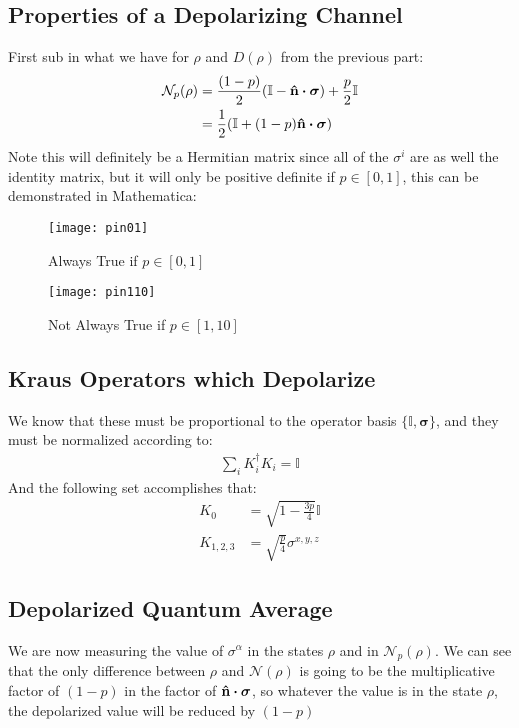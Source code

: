 \documentclass[12pt]{article}
\begin{document}
\subsection{Properties of a Depolarizing Channel}
First sub in what we have for $\rho$ and $D(\rho)$ from the previous part:
\begin{align*}
  \mathcal{N}_p(\rho)&=\frac{(1-p)}{2}(\mathbb{I}-\vu{n}\vdot\bm\sigma)
  +\frac{p}{2}\mathbb{I}\\
  &=\frac12\qty(\mathbb{I}+(1-p)\vu{n}\vdot\bm\sigma)
\end{align*}
Note this will definitely be a Hermitian matrix since all of the $\sigma^i$ are as well the identity matrix, but it will only be positive definite if $p\in[0,1]$, this can be demonstrated in Mathematica:
\begin{figure}[H]
  \centering
  \texttt{[image: pin01]}
  \caption{Always True if $p\in[0,1]$}
\end{figure}
\begin{figure}[H]
  \centering
  \texttt{[image: pin110]}
  \caption{Not Always True if $p\in[1,10]$}
\end{figure}
\subsection{Kraus Operators which Depolarize}
We know that these must be proportional to the operator basis $\{\mathbb{I},\bm\sigma\}$, and they must be normalized according to:
\begin{align*}
  \sum_iK_i^\dag K_i=\mathbb{I}
\end{align*}
And the following set accomplishes that:
\begin{equation*}
  \boxed{\begin{aligned}
      K_0&=\sqrt{1-\frac{3p}4}\mathbb{I}\\
      K_{1,2,3}&=\sqrt{\frac{p}{4}}\sigma^{x,y,z}
    \end{aligned}}
\end{equation*}

\subsection{Depolarized Quantum Average}
We are now measuring the value of $\sigma^\alpha$ in the states $\rho$ and in $\mathcal{N}_p(\rho)$. We can see that the only difference between $\rho$ and $\mathcal{N}(\rho)$ is going to be the multiplicative factor of $(1-p)$ in the factor of $\vu{n}\vdot\bm\sigma$, so whatever the value is in the state $\rho$, the depolarized value will be reduced by $(1-p)$
\end{document}
